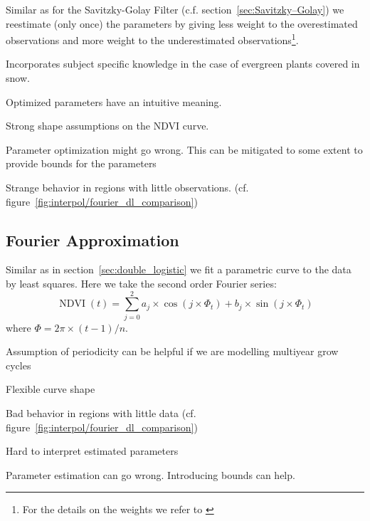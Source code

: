Similar as for the Savitzky-Golay Filter (c.f. section~\ref{sec:Savitzky–Golay}) we reestimate (only once) the parameters by giving less weight to the overestimated observations and more weight to the underestimated observations\footnote{For the details on the weights we refer to \cite{beckImprovedMonitoringVegetation2006}}.

\begin{my_pros_cons_table}{
		\item Incorporates subject specific knowledge in the case of evergreen plants covered in snow.
		\item Optimized parameters have an intuitive meaning.
	}{
		\item Strong shape assumptions on the NDVI curve.
		\item Parameter optimization might go wrong. This can be mitigated to some extent to provide bounds for the parameters
		\item Strange behavior in regions with little observations. (cf. figure~\ref{fig:interpol/fourier_dl_comparison})
	}
\end{my_pros_cons_table}


\subsection{Fourier Approximation}
\label{sec:fourier_approx}
Similar as in section~\ref{sec:double_logistic} we fit a parametric curve to the data by least squares. Here we take the second order Fourier series:
$$
	\operatorname{NDVI}(t)=\sum_{j=0}^{2} a_{j} \times \cos \left(j \times \Phi_{t}\right)+b_{j} \times \sin \left(j \times \Phi_{t}  \right)
$$
where $\Phi=2 \pi \times(t-1) / n$.


\begin{my_pros_cons_table}{
		\item Assumption of periodicity can be helpful if we are modelling multiyear grow cycles
		\item Flexible curve shape
	}{
		\item Bad behavior in regions with little data (cf. figure~\ref{fig:interpol/fourier_dl_comparison})
		\item Hard to interpret estimated parameters
		\item Parameter estimation can go wrong. Introducing bounds can help.
	}
\end{my_pros_cons_table}

